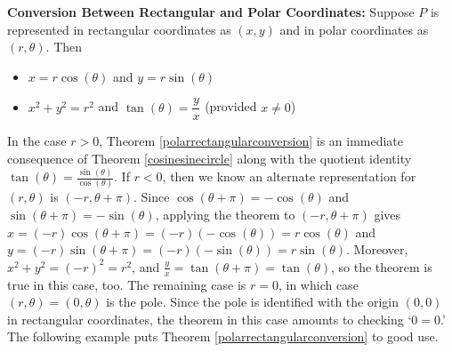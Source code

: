 \smallskip

\colorbox{ResultColor}{\bbm

\begin{thm} \label{polarrectangularconversion} \textbf{Conversion Between Rectangular and Polar Coordinates:}  Suppose $P$ is represented in rectangular coordinates as $(x,y)$ and in polar coordinates as $(r,\theta)$.  Then

\begin{itemize}

\item $x = r \cos(\theta)$ and $y = r\sin(\theta)$ 

\item $x^2+y^2 = r^2$ and $\tan(\theta) = \dfrac{y}{x}$ (provided $x \neq 0$) 

\end{itemize}

\end{thm}

\ebm}

\smallskip

In the case $r > 0$, Theorem \ref{polarrectangularconversion} is an immediate consequence of Theorem \ref{cosinesinecircle} along with the quotient identity  $\tan(\theta) = \frac{\sin(\theta)}{\cos(\theta)}$. If $r < 0$, then we know an alternate representation for $(r,\theta)$ is $(-r, \theta + \pi)$. Since $\cos(\theta + \pi) = -\cos(\theta)$ and $\sin(\theta + \pi) = -\sin(\theta)$, applying the theorem to $(-r,\theta+\pi)$ gives $x = (-r) \cos(\theta + \pi) = (-r)(-\cos(\theta)) = r\cos(\theta)$ and $y = (-r) \sin(\theta + \pi) = (-r)(-\sin(\theta)) = r\sin(\theta)$.  Moreover, $x^2 + y^2 = (-r)^2 = r^2$, and $\frac{y}{x} = \tan(\theta + \pi) = \tan(\theta)$, so the theorem is true in this case, too.  The remaining case is $r = 0$, in which case $(r,\theta) = (0,\theta)$ is the pole.  Since the pole is identified with the origin $(0,0)$ in rectangular coordinates, the theorem in this case amounts to checking `$0=0$.'  The following example puts Theorem \ref{polarrectangularconversion} to good use.


